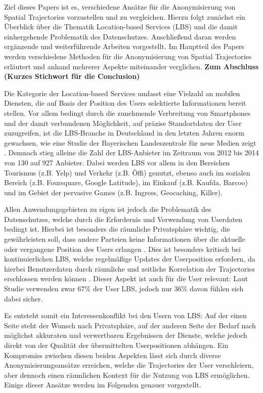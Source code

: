 Ziel dieses Papers ist es, verschiedene Ansätze für die Anonymisierung von Spatial Trajectories vorzustellen und zu vergleichen. Hierzu folgt zunächst ein Überblick über die Thematik Location-based Services (LBS) und die damit einhergehende Problematik des Datenschutzes. Anschließend daran werden ergänzende und weiterführende Arbeiten vorgestellt. Im Hauptteil des Papers werden verschiedene Methoden für die Anonymisierung von Spatial Trajectories erläutert und anhand mehrerer Aspekte miteinander verglichen. \textbf{Zum Abschluss (Kurzes Stichwort für die Conclusion)}

Die Kategorie der Location-based Services umfasst eine Vielzahl an mobilen Diensten, die auf Basis der Position des Users selektierte Informationen bereit stellen. Vor allem bedingt durch die zunehmende Verbreitung von Smartphones und der damit verbundenen Möglichkeit, auf präzise Standortdaten der User zuzugreifen, ist die LBS-Branche in Deutschland in den letzten Jahren enorm gewachsen, wie eine Studie der Bayerischen Landeszentrale für neue Medien zeigt \cite{Consulting2014}. Demnach stieg alleine die Zahl der LBS-Anbieter im Zeitraum von 2012 bis 2014 von 130 auf 927 Anbieter. Dabei werden LBS vor allem in den Bereichen Tourismus (z.B. Yelp) und Verkehr (z.B. Öffi) genutzt, ebenso auch im sozialen Bereich (z.B. Foursquare, Google Latitude), im Einkauf (z.B. Kaufda, Barcoo) und im Gebiet der pervasive Games (z.B. Ingress, Geocaching, Killer).

Allen Anwendungsgebieten zu eigen ist jedoch die Problematik des Datenschutzes, welche durch die Erfordernis und Verwendung von Userdaten bedingt ist. Hierbei ist besonders die räumliche Privatsphäre wichtig, die gewährleisten soll, dass andere Parteien keine Informationen über die aktuelle oder vergangene Position des Users erlangen \cite{Beresford2003}. Dies ist besonders kritisch bei kontinuierlichen LBS, welche regelmäßige Updates der Userposition erfordern, da hierbei Benutzerdaten durch räumliche und zeitliche Korrelation der Trajectories erschlossen werden können \cite{Chow2011}. Dieser Aspekt ist auch für die User relevant: Laut Studie verwenden zwar 67\% der User LBS, jedoch nur 36\% davon fühlen sich dabei sicher.

Es entsteht somit ein Interessenkonflikt bei den Usern von LBS: Auf der einen Seite steht der Wunsch nach Privatsphäre, auf der anderen Seite der Bedarf nach möglichst akkuraten und verwertbaren Ergebnissen der Dienste, welche jedoch direkt von der Qualität der übermittelten Userpositionen abhängen. Ein Kompromiss zwischen diesen beiden Aspekten lässt sich durch diverse Anonymisierungsansätze erreichen, welche die Trajectories der User verschleiern, aber dennoch einen räumlichen Kontext für die Nutzung von LBS ermöglichen. Einige dieser Ansätze werden im Folgenden genauer vorgestellt.